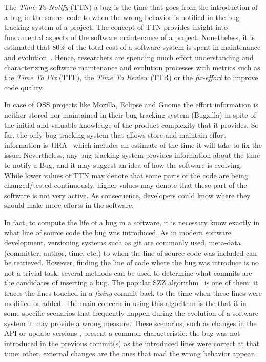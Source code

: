 \documentclass[10pt, conference]{IEEEtran}
\begin{document}
The \emph{Time To Notify} (TTN) a bug is the time that goes from the introduction of a bug in the source code to when the wrong behavior is notified in the bug tracking system of a project. The concept of TTN provides insight into fundamental aspects of the software maintenance of a project. Nonetheless, it is estimated that 80\% of the total cost of a software system is spent in maintenance and evolution~\cite{tassey2002economic}. Hence, researchers are spending much effort understanding and characterizing software maintenance and evolution processes with metrics such as the \emph{Time To Fix} (TTF), the \emph{Time To Review} (TTR) or the \emph{fix-effort} to improve code quality. 

In case of OSS projects like Mozilla, Eclipse and Gnome the effort information is neither stored nor maintained in their bug tracking system (Bugzilla) in spite of the initial and valuable knowledge of the product complexity that it provides. So far, the only bug tracking system that allows store and maintain effort information is JIRA~\cite{weiss2007long} which includes an estimate of the time it will take to fix the issue. Nevertheless, any bug tracking system provides information about the time to notify a Bug, and it may suggest an idea of how the software is evolving. While lower values of TTN may denote that some parts of the code are being changed/tested continuously, higher values may denote that these part of the software is not very active. As consecuence, developers could know where they should make more efforts in the software. 


In fact, to compute the life of a bug in a software, it is necessary know exactly in what line of source code the bug was introduced. As in modern software development, versioning systems such as git are commonly used, meta-data (committer, author, time, etc.) to when the line of source code was included can be retrieved. However, finding the line of code where the bug was introduce is no not a trivial task; several methods can be used to determine what commits are the candidates of inserting a bug. The popular SZZ algorithm~\cite{sliwerski2005changes} is one of them: it traces the lines touched in a \emph{fixing} commit back to the time when these lines were modified or added. The main concern in using this algorithm is the that it in some specific scenarios that frequently happen during the evolution of a software system it may provide a wrong measure. These scenarios, such as changes in the API or update versions , present a common characteristic: the bug was not introduced in the  previous commit(s) as the introduced lines were correct at that time; other, external changes are the ones that mad the wrong behavior appear. 
\end{document}
